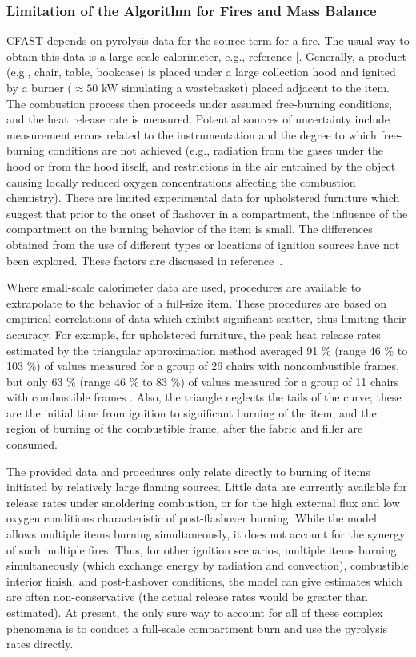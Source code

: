  \subsubsection{Limitation of the Algorithm for Fires and Mass Balance }\label{sec:firemassbalance}

CFAST depends on pyrolysis data for the source term for a fire. The usual way to obtain this data is a large-scale calorimeter, e.g., reference [\cite{Bryant:2003}. Generally, a product (e.g., chair, table, bookcase) is placed under a large collection hood and ignited by a burner ($\approx 50$ kW simulating a wastebasket) placed adjacent to the item.  The combustion process then proceeds under assumed free-burning conditions, and the heat release rate is measured.  Potential sources of uncertainty include measurement errors related to the instrumentation and the degree to which free-burning conditions are not achieved (e.g., radiation from the gases under the hood or from the hood itself, and restrictions in the air entrained by the object causing locally reduced oxygen concentrations affecting the combustion chemistry).  There are limited experimental data for upholstered furniture which suggest that prior to the onset of flashover in a compartment, the influence of the compartment on the burning behavior of the item is small.  The differences obtained from the use of different types or locations of ignition sources have not been explored. These factors are discussed in reference~\cite{Babrauskas:1982}.

Where small-scale calorimeter data are used, procedures are available to extrapolate to the behavior of a full-size item.  These procedures are based on empirical correlations of data which exhibit significant scatter, thus limiting their accuracy.  For example, for upholstered furniture, the peak heat release rates estimated by the triangular approximation method averaged 91 \% (range 46 \% to 103 \%) of values measured for a group of 26 chairs with noncombustible frames, but only 63 \% (range 46 \% to 83 \%) of values measured for a group of 11 chairs with combustible frames \cite{Babrauskas:1985}.  Also, the triangle neglects the tails of the curve; these are the initial time from ignition to significant burning of the item, and the region of burning of the combustible frame, after the fabric and filler are consumed.

The provided data and procedures only relate directly to burning of items initiated by relatively large flaming sources.  Little data are currently available for release rates under smoldering combustion, or for the high external flux and low oxygen conditions characteristic of post-flashover burning.  While the model allows multiple items burning simultaneously, it does not account for the synergy of such multiple fires.  Thus, for other ignition scenarios, multiple items burning simultaneously (which exchange energy by radiation and convection), combustible interior finish, and post-flashover conditions, the model can give estimates which are often non-conservative (the actual release rates would be greater than estimated).  At present, the only sure way to account for all of these complex phenomena is to conduct a full-scale compartment burn and use the pyrolysis rates directly.

